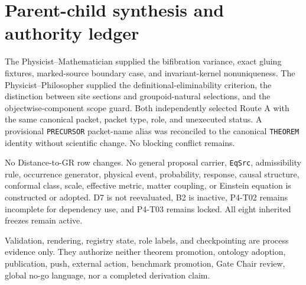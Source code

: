 \documentclass[11pt]{article}
\begin{document}
\section{Parent-child synthesis and authority ledger}

The Physicist--Mathematician supplied the bifibration variance, exact gluing
fixtures, marked-source boundary case, and invariant-kernel nonuniqueness. The
Physicist--Philosopher supplied the definitional-eliminability criterion, the
distinction between site sections and groupoid-natural selections, and the
objectwise-component scope guard. Both independently selected Route A with the
same canonical packet, packet type, role, and unexecuted status. A provisional
\texttt{PRECURSOR} packet-name alias was reconciled to the canonical
\texttt{THEOREM} identity without scientific change. No blocking conflict
remains.

No Distance-to-GR row changes. No general proposal carrier, \texttt{EqSrc},
admissibility rule, occurrence generator, physical event, probability,
response, causal structure, conformal class, scale, effective metric, matter
coupling, or Einstein equation is constructed or adopted. D7 is not
reevaluated, B2 is inactive, P4-T02 remains incomplete for dependency use, and
P4-T03 remains locked. All eight inherited freezes remain active.

Validation, rendering, registry state, role labels, and checkpointing are
process evidence only. They authorize neither theorem promotion, ontology
adoption, publication, push, external action, benchmark promotion, Gate Chair
review, global no-go language, nor a completed derivation claim.
\end{document}
